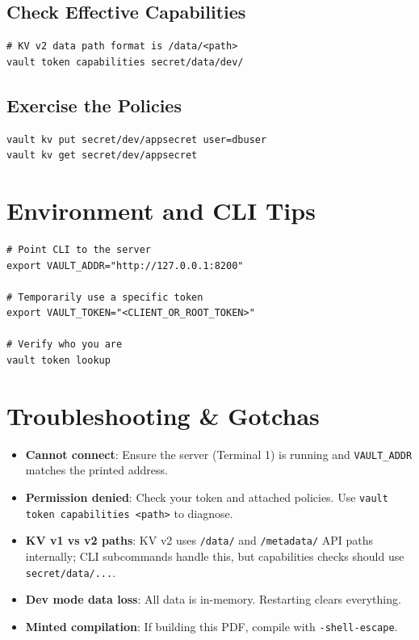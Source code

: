 \documentclass[11pt]{article}
\begin{document}
\subsection{Check Effective Capabilities}
\begin{verbatim}
# KV v2 data path format is /data/<path>
vault token capabilities secret/data/dev/
\end{verbatim}

\subsection{Exercise the Policies}
\begin{verbatim}
vault kv put secret/dev/appsecret user=dbuser
vault kv get secret/dev/appsecret
\end{verbatim}

\section{Environment and CLI Tips}
\begin{verbatim}
# Point CLI to the server
export VAULT_ADDR="http://127.0.0.1:8200"

# Temporarily use a specific token
export VAULT_TOKEN="<CLIENT_OR_ROOT_TOKEN>"

# Verify who you are
vault token lookup
\end{verbatim}

\section{Troubleshooting \& Gotchas}
\begin{itemize}[itemsep=4pt]
  \item \textbf{Cannot connect}: Ensure the server (Terminal 1) is running and \texttt{VAULT\_ADDR} matches the printed address.
  \item \textbf{Permission denied}: Check your token and attached policies. Use \texttt{vault token capabilities <path>} to diagnose.
  \item \textbf{KV v1 vs v2 paths}: KV v2 uses \texttt{/data/} and \texttt{/metadata/} API paths internally; CLI subcommands handle this, but capabilities checks should use \texttt{secret/data/...}.
  \item \textbf{Dev mode data loss}: All data is in-memory. Restarting clears everything.
  \item \textbf{Minted compilation}: If building this PDF, compile with \texttt{-shell-escape}.
\end{itemize}
\end{document}
